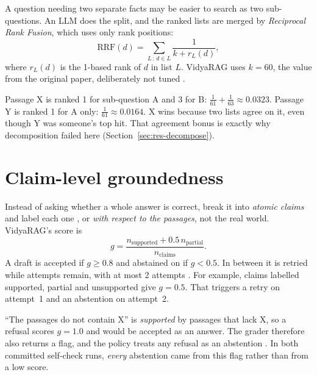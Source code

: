 A question needing two separate facts may be easier to search as two sub-questions. An LLM does the split, and the ranked lists are merged by \emph{Reciprocal Rank Fusion}, which uses only rank positions:
\begin{equation}
\mathrm{RRF}(d) = \sum_{L\,:\,d\in L} \frac{1}{k + r_L(d)},
\end{equation}
where $r_L(d)$ is the 1-based rank of $d$ in list $L$. VidyaRAG uses $k=60$, the value from the original paper, deliberately not tuned .

\begin{example}[RRF with $k=60$]
Passage X is ranked 1 for sub-question A and 3 for B: $\tfrac{1}{61}+\tfrac{1}{63}\approx0.0323$. Passage Y is ranked 1 for A only: $\tfrac{1}{61}\approx0.0164$. X wins because two lists agree on it, even though Y was someone's top hit. That agreement bonus is exactly why decomposition failed here (Section~\ref{sec:res-decompose}).
\end{example}

\section{Claim-level groundedness}
\label{sec:groundedness}

Instead of asking whether a whole answer is correct, break it into \emph{atomic claims} and label each one ,  or  \emph{with respect to the passages}, not the real world. VidyaRAG's score is
\begin{equation}
g = \frac{n_{\text{supported}} + 0.5\,n_{\text{partial}}}{n_{\text{claims}}}.
\end{equation}
A draft is accepted if $g\ge0.8$ and abstained on if $g<0.5$. In between it is retried while attempts remain, with at most 2 attempts . For example, claims labelled supported, partial and unsupported give $g=0.5$. That triggers a retry on attempt~1 and an abstention on attempt~2.

\begin{keyidea}
``The passages do not contain X'' is \emph{supported} by passages that lack X, so a refusal scores $g=1.0$ and would be accepted as an answer. The grader therefore also returns a  flag, and the policy treats any refusal as an abstention . In both committed self-check runs, \emph{every} abstention came from this flag rather than from a low score.
\end{keyidea}

